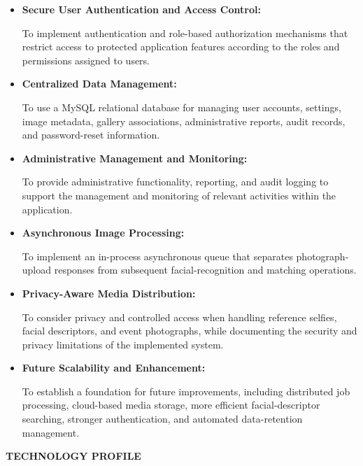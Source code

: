 \begin{itemize}
    \item \textbf{Secure User Authentication and Access Control:}
          \par \noindent To implement authentication and role-based authorization mechanisms that restrict access to protected application features according to the roles and permissions assigned to users.

    \item \textbf{Centralized Data Management:}
          \par \noindent To use a MySQL relational database for managing user accounts, settings, image metadata, gallery associations, administrative reports, audit records, and password-reset information.

    \item \textbf{Administrative Management and Monitoring:}
          \par \noindent To provide administrative functionality, reporting, and audit logging to support the management and monitoring of relevant activities within the application.

    \item \textbf{Asynchronous Image Processing:}
          \par \noindent To implement an in-process asynchronous queue that separates photograph-upload responses from subsequent facial-recognition and matching operations.

    \item \textbf{Privacy-Aware Media Distribution:}
          \par \noindent To consider privacy and controlled access when handling reference selfies, facial descriptors, and event photographs, while documenting the security and privacy limitations of the implemented system.

    \item \textbf{Future Scalability and Enhancement:}
          \par \noindent To establish a foundation for future improvements, including distributed job processing, cloud-based media storage, more efficient facial-descriptor searching, stronger authentication, and automated data-retention management.
\end{itemize}

\clearpage

\begin{center}
    \vspace*{\fill}
    \fontsize{28}{28}\selectfont \textbf{TECHNOLOGY PROFILE}
    \vspace*{\fill}
\end{center}
\clearpage

